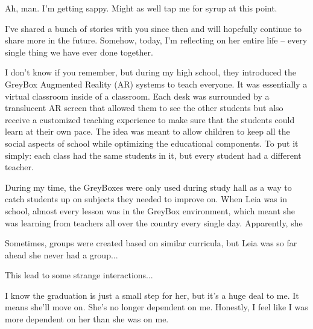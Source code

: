 Ah, man.
I'm getting sappy.
Might as well tap me for syrup at this point.

I've shared a bunch of stories with you since then and will hopefully continue to share more in the future.
Somehow, today, I'm reflecting on her entire life -- every single thing we have ever done together.

I don't know if you remember, but during my high school, they introduced the GreyBox Augmented Reality (AR) systems to teach everyone.
It was essentially a virtual classroom inside of a classroom.
Each desk was surrounded by a translucent AR screen that allowed them to see the other students but also receive a customized teaching experience to make sure that the students could learn at their own pace.
The idea was meant to allow children to keep all the social aspects of school while optimizing the educational components.
To put it simply: each class had the same students in it, but every student had a different teacher.

During my time, the GreyBoxes were only used during study hall as a way to catch students up on subjects they needed to improve on.
When Leia was in school, almost every lesson was in the GreyBox environment, which meant she was learning from teachers all over the country every single day.
Apparently, she 

Sometimes, groups were created based on similar curricula, but Leia was so far ahead she never had a group...

This lead to some strange interactions...

I know the graduation is just a small step for her, but it's a huge deal to me.
It means she'll move on.
She's no longer dependent on me.
Honestly, I feel like I was more dependent on her than she was on me.
